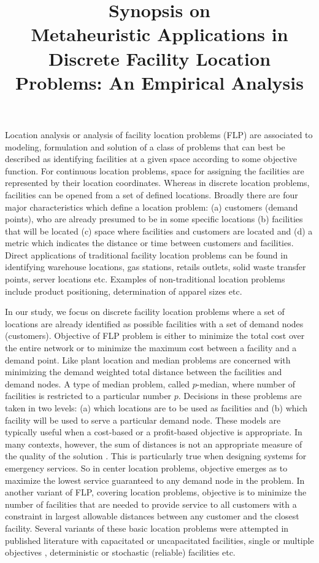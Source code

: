 \documentclass[12pt]{article}
\title{\textbf{Synopsis on} \\  Metaheuristic Applications in Discrete Facility Location Problems: An Empirical Analysis}
\date{}
\begin{document}
\maketitle
Location analysis or analysis of facility location problems (FLP) are associated to modeling, formulation and solution of a class of problems that can best be described as identifying facilities at a given space according to some objective function. For continuous location problems, space for assigning the facilities are represented by their location coordinates. Whereas in discrete location problems, facilities can be opened from a set of defined locations. Broadly there are four major characteristics which define a location problem: (a) customers (demand points), who are already presumed to be in some specific locations (b) facilities that will be located (c) space where facilities and customers are located and (d) a metric which indicates the distance or time between customers and facilities. Direct applications of traditional facility location problems can be found in identifying warehouse locations, gas stations, retails outlets, solid waste transfer points, server locations etc. Examples of non-traditional location problems include product positioning, determination of apparel sizes etc.

In our study, we focus on discrete facility location problems where a set of locations are already identified as possible facilities with a set of demand nodes (customers). Objective of FLP problem is either to minimize the total cost over the entire network or to minimize the maximum cost between a facility and a demand point. Like plant location and median problems are concerned with minimizing the demand weighted total distance between the facilities and demand nodes. A type of median problem, called $p$-median, where number of facilities is restricted to a particular number $p$. Decisions in these problems are taken in two levels: (a) which locations are to be used as facilities and (b) which facility will be used to serve a particular demand node. These models are typically useful when a cost-based or a profit-based objective is appropriate. In many contexts, however, the sum of distances is not an appropriate measure of the quality of the solution \cite{Guner2008}. This is particularly true when designing systems for emergency services. So in center location problems, objective emerges as to maximize the lowest service guaranteed to any demand node in the problem. In another variant of FLP, covering location problems, objective is to minimize the number of facilities that are needed to provide service to all customers with a constraint in largest allowable distances between any customer and the closest facility. Several variants of these basic location problems were attempted in published literature with capacitated or uncapacitated facilities, single or multiple objectives \cite{Yapicioglu2007}, deterministic or stochastic (reliable) facilities etc. 
\end{document}
